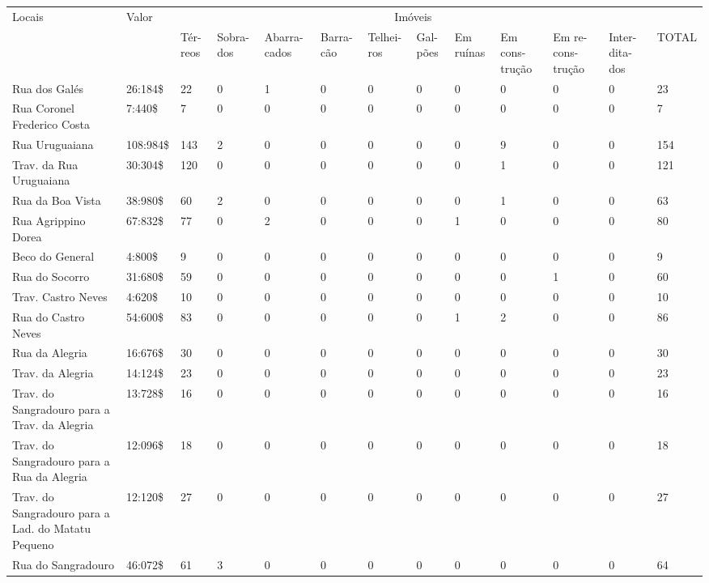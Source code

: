 \begin{table}
{
\begin{minipage}{\textwidth}
\begin{tiny}
\begin{tabular}{m{} m{1cm} m{} m{} m{} m{} m{} m{} m{} m{} m{} m{} m{}}
\hline
\multirow{2}{*}{Locais}	& \multirow{2}{*}{Valor}	& \multicolumn{10}{c}{Imóveis}\\
\cline{3-13}
	&	&Tér- reos	&Sobra- dos	&Abarra- cados	&Barra- cão	&Telhei- ros	&Gal- pões	&Em ruínas	&Em cons- trução	&Em re- cons- trução	&Inter- dita- dos	&TOTAL\\
\hline
\hline
Rua dos Galés							&26:184\$	&22	&0	&1	&0	&0	&0	&0	&0	&0	&0	&23\\
Rua Coronel Frederico Costa					&7:440\$	&7	&0	&0	&0	&0	&0	&0	&0	&0	&0	&7\\
Rua Uruguaiana							&108:984\$	&143	&2	&0	&0	&0	&0	&0	&9	&0	&0	&154\\
Trav. da Rua Uruguaiana					&30:304\$	&120	&0	&0	&0	&0	&0	&0	&1	&0	&0	&121\\
Rua da Boa Vista						&38:980\$	&60	&2	&0	&0	&0	&0	&0	&1	&0	&0	&63\\
Rua Agrippino Dorea						&67:832\$	&77	&0	&2	&0	&0	&0	&1	&0	&0	&0	&80\\
Beco do General							&4:800\$	&9	&0	&0	&0	&0	&0	&0	&0	&0	&0	&9\\
Rua do Socorro							&31:680\$	&59	&0	&0	&0	&0	&0	&0	&0	&1	&0	&60\\
Trav. Castro Neves					&4:620\$	&10	&0	&0	&0	&0	&0	&0	&0	&0	&0	&10\\
Rua do Castro Neves						&54:600\$	&83	&0	&0	&0	&0	&0	&1	&2	&0	&0	&86\\
Rua da Alegria							&16:676\$	&30	&0	&0	&0	&0	&0	&0	&0	&0	&0	&30\\
Trav. da Alegria						&14:124\$	&23	&0	&0	&0	&0	&0	&0	&0	&0	&0	&23\\
Trav. do Sangradouro para a Trav. da Alegria		&13:728\$	&16	&0	&0	&0	&0	&0	&0	&0	&0	&0	&16\\
Trav. do Sangradouro para a Rua da Alegria			&12:096\$	&18	&0	&0	&0	&0	&0	&0	&0	&0	&0	&18\\
Trav. do Sangradouro para a Lad. do Matatu Pequeno	&12:120\$	&27	&0	&0	&0	&0	&0	&0	&0	&0	&0	&27\\
Rua do Sangradouro						&46:072\$	&61	&3	&0	&0	&0	&0	&0	&0	&0	&0	&64\\

\end{tabular}
\end{tiny}
\end{minipage}}
\end{table}
